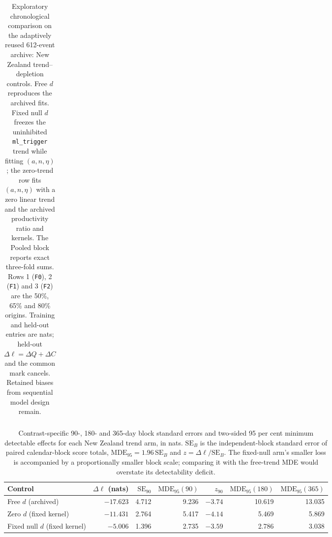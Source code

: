 \begin{table}[htbp]
\begin{tabular}{@{}llrrrrrrrr@{}}
\bottomrule\end{tabular}
\caption{Exploratory chronological comparison on the adaptively reused 612-event archive: New Zealand trend--depletion controls. Free $d$ reproduces the archived fits. Fixed null $d$ freezes the uninhibited \texttt{ml\_trigger} trend while fitting $(a,n,\eta)$; the zero-trend row fits $(a,n,\eta)$ with a zero linear trend and the archived productivity ratio and kernels. The Pooled block reports exact three-fold sums. Rows 1 (\texttt{F0}), 2 (\texttt{F1}) and 3 (\texttt{F2}) are the 50\%, 65\% and 80\% origins. Training and held-out entries are nats; held-out $\Delta\ell=\Delta Q+\Delta C$ and the common mark cancels. Retained biases from sequential model design remain.}
\label{tab:nz-trend-controls}
\end{table}

\begin{table}[htbp]\centering\scriptsize
\setlength{\tabcolsep}{3pt}
\begin{tabular}{@{}lrrrrrr@{}}\toprule
Control & $\Delta\ell$ (nats) & $\mathrm{SE}_{90}$ & $\mathrm{MDE}_{95}(90)$ & $z_{90}$ & $\mathrm{MDE}_{95}(180)$ & $\mathrm{MDE}_{95}(365)$\\\midrule
Free $d$ (archived) & $-17.623$ & 4.712 & 9.236 & $-3.74$ & 10.619 & 13.035 \\
Zero $d$ (fixed kernel) & $-11.431$ & 2.764 & 5.417 & $-4.14$ & 5.469 & 5.869 \\
Fixed null $d$ (fixed kernel) & $-5.006$ & 1.396 & 2.735 & $-3.59$ & 2.786 & 3.038 \\
\bottomrule\end{tabular}
\caption{Contrast-specific 90-, 180- and 365-day block standard errors and two-sided 95 per cent minimum detectable effects for each New Zealand trend arm, in nats. $\mathrm{SE}_B$ is the independent-block standard error of paired calendar-block score totals, $\mathrm{MDE}_{95}=1.96\,\mathrm{SE}_B$ and $z=\Delta\ell/\mathrm{SE}_B$. The fixed-null arm's smaller loss is accompanied by a proportionally smaller block scale; comparing it with the free-trend MDE would overstate its detectability deficit.}
\label{tab:nz-own-mde}
\end{table}
